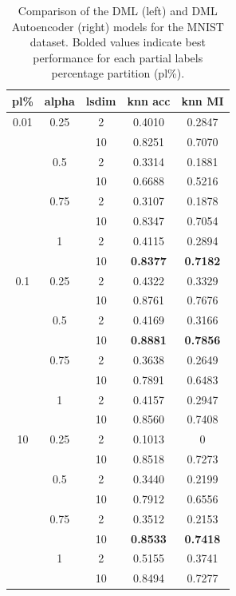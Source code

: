 \documentclass[./dissertation.tex]{subfiles}
\begin{document}
\begin{table}[]
\begin{tabular}{|c|c|c|c|c|}
            \hline
            \textbf{pl\%} & \textbf{alpha} & \textbf{lsdim} & \textbf{knn acc} & \textbf{knn MI}  \\
            \hline
            0.01 & 0.25 & 2 & 0.4010 & 0.2847 \\
             &  & 10 & 0.8251 & 0.7070 \\
             & 0.5 & 2 & 0.3314 & 0.1881 \\
             &  & 10 & 0.6688 & 0.5216 \\
             & 0.75 & 2 & 0.3107 & 0.1878 \\
             &  & 10 & 0.8347 & 0.7054 \\
             & 1 & 2 & 0.4115 & 0.2894 \\
             &  & 10 & \textbf{0.8377} & \textbf{0.7182} \\
            0.1 & 0.25 & 2 & 0.4322 & 0.3329 \\
             &  & 10 & 0.8761 & 0.7676 \\
             & 0.5 & 2 & 0.4169 & 0.3166 \\
             &  & 10 & \textbf{0.8881} & \textbf{0.7856} \\
             & 0.75 & 2 & 0.3638 & 0.2649 \\
             &  & 10 & 0.7891 & 0.6483 \\
             & 1 & 2 & 0.4157 & 0.2947 \\
             &  & 10 & 0.8560 & 0.7408 \\
            10 & 0.25 & 2 & 0.1013 & 0 \\
             &  & 10 & 0.8518 & 0.7273 \\
             & 0.5 & 2 & 0.3440 & 0.2199 \\
             &  & 10 & 0.7912 & 0.6556 \\
             & 0.75 & 2 & 0.3512 & 0.2153 \\
             &  & 10 & \textbf{0.8533} & \textbf{0.7418} \\
             & 1 & 2 & 0.5155 & 0.3741 \\
             &  & 10 & 0.8494 & 0.7277 \\
            \hline
       \end{tabular}
       \caption{Comparison of the DML (left) and DML Autoencoder (right) models for the MNIST dataset. Bolded values indicate best performance for each partial labels percentage partition (pl\%).\\}
       \label{tab:my_label}
   \end{table}
\end{document}
